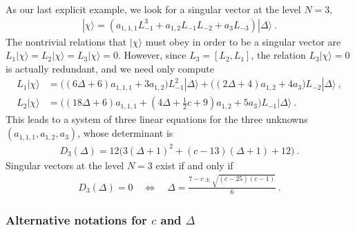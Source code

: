 \documentclass[12pt, a4paper, notitlepage, twoside]{report}
\numberwithin{equation}{section}
\theoremstyle{break}
\begin{document}
As our last explicit example, we look for a singular vector at the level $N=3$,
\begin{align}
 |\chi\rangle = \left(a_{1,1,1} L_{-1}^3 + a_{1,2}L_{-1}L_{-2} + a_3 L_{-3}\right) |\Delta\rangle\ .
\end{align}
The nontrivial relations that $|\chi\rangle$ must obey in order to be a singular vector are $L_1|\chi\rangle =L_2|\chi\rangle= L_3 |\chi\rangle=0$.
However, since $L_3 = [L_2,L_1]$, the relation $L_3|\chi\rangle=0$ is actually redundant, and we need only compute
\begin{align}
 L_1|\chi\rangle &= \Big((6\Delta+6)a_{1,1,1}+3a_{1,2}\Big)L_{-1}^2|\Delta\rangle +\Big((2\Delta+4)a_{1,2}+4a_3\Big)L_{-2}|\Delta\rangle\ ,
\\
L_2|\chi\rangle &= \Big((18\Delta+6)a_{1,1,1}+(4\Delta+\tfrac12c +9)a_{1,2}+5a_3\Big)L_{-1}|\Delta\rangle\ .
\end{align}
This leads to a system of three linear equations for the three unknowns $(a_{1,1,1},a_{1,2},a_3)$, whose determinant is
\begin{align}
 D_3(\Delta) = 12\Big(3(\Delta+1)^2+(c-13)(\Delta+1)+12\Big)\ .
\end{align}
Singular vectors at the level $N=3$ exist if and only if 
\begin{align}
 D_3(\Delta) = 0 \quad \iff \quad \Delta = \frac{7-c\pm\sqrt{(c-25)(c-1)}}{6}\ .
\end{align}

\subsubsection{Alternative notations for $c$ and $\Delta$}
\end{document}
